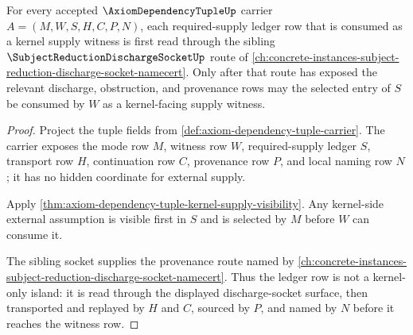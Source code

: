 \begin{theorem}
\label{thm:axiom-dependency-tuple-supply-provenance-sibling-route}
For every accepted $\AxiomDependencyTupleUp$ carrier
$A=(M,W,S,H,C,P,N)$, each required-supply ledger row that is consumed as a
kernel supply witness is first read through the sibling
$\SubjectReductionDischargeSocketUp$ route of
\autoref{ch:concrete-instances-subject-reduction-discharge-socket-namecert}.
Only after that route has exposed the relevant discharge, obstruction, and
provenance rows may the selected entry of $S$ be consumed by $W$ as a
kernel-facing supply witness.
\end{theorem}
\begin{proof}
Project the tuple fields from \autoref{def:axiom-dependency-tuple-carrier}.
The carrier exposes the mode row $M$, witness row $W$, required-supply ledger
$S$, transport row $H$, continuation row $C$, provenance row $P$, and local
naming row $N$; it has no hidden coordinate for external supply.

Apply \autoref{thm:axiom-dependency-tuple-kernel-supply-visibility}. Any
kernel-side external assumption is visible first in $S$ and is selected by
$M$ before $W$ can consume it.

The sibling socket supplies the provenance route named by
\autoref{ch:concrete-instances-subject-reduction-discharge-socket-namecert}.
Thus the ledger row is not a kernel-only island: it is read through the
displayed discharge-socket surface, then transported and replayed by $H$ and
$C$, sourced by $P$, and named by $N$ before it reaches the witness row.
\end{proof}

